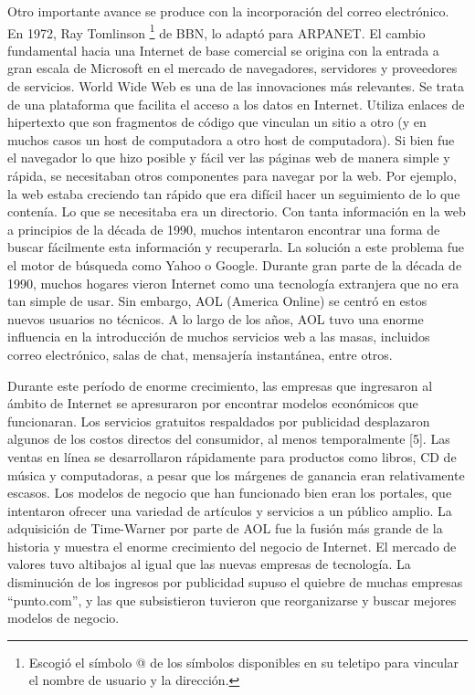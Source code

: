 \documentclass[12pt]{report} %
\begin{document}
Otro importante avance se produce con la incorporación del correo electrónico.  En 1972,  Ray Tomlinson \footnote{Escogió el símbolo @ de los símbolos disponibles en su teletipo para vincular el nombre de usuario y la dirección.}  de BBN, lo adaptó para ARPANET. El cambio fundamental hacia una Internet de base comercial se origina con la entrada a gran escala de Microsoft en el mercado de navegadores, servidores y proveedores de servicios. World Wide Web es una de las innovaciones más relevantes. Se trata de una plataforma que facilita el acceso a los datos en Internet. Utiliza enlaces de hipertexto que son fragmentos de código que vinculan un sitio a otro (y en muchos casos un host de computadora a otro host de computadora). Si bien fue el navegador lo que hizo posible y fácil ver las páginas web de manera simple y rápida, se necesitaban otros componentes para navegar por la web. Por ejemplo, la web estaba creciendo tan rápido que era difícil hacer un seguimiento de lo que contenía. Lo que se necesitaba era un directorio. Con tanta información en la web a principios de la década de 1990, muchos intentaron encontrar una forma de buscar fácilmente esta información y recuperarla. La solución a este problema fue el motor de búsqueda como Yahoo o Google. Durante gran parte de la década de 1990, muchos hogares vieron Internet como una tecnología extranjera que no era tan simple de usar. Sin embargo, AOL (America Online) se centró en estos nuevos usuarios no técnicos. A lo largo de los años, AOL tuvo una enorme influencia en la introducción de muchos servicios web a las masas, incluidos correo electrónico, salas de chat, mensajería instantánea, entre otros.

Durante este período de enorme crecimiento, las empresas que ingresaron al ámbito de Internet se apresuraron por encontrar modelos económicos que funcionaran. Los servicios gratuitos respaldados por publicidad desplazaron algunos de los costos directos del consumidor, al menos temporalmente [5]. Las ventas en línea se desarrollaron rápidamente para productos como libros, CD de música y computadoras, a pesar que los márgenes de ganancia eran relativamente escasos. Los modelos de negocio que han funcionado bien eran los portales, que intentaron ofrecer una variedad de artículos y servicios a un público amplio. La adquisición de Time-Warner por parte de AOL fue la fusión más grande de la historia y muestra el enorme crecimiento del negocio de Internet. El mercado de valores tuvo altibajos al igual que las nuevas empresas de tecnología. La disminución de los ingresos por publicidad supuso el quiebre de muchas empresas “punto.com”, y las que subsistieron tuvieron que reorganizarse y buscar mejores modelos de negocio.
\end{document}
